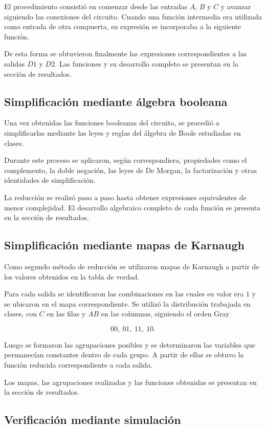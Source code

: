 \documentclass[12pt]{report}
\begin{document}
El procedimiento consistió en comenzar desde las entradas $A$, $B$ y $C$ y avanzar
siguiendo las conexiones del circuito. Cuando una función intermedia era utilizada
como entrada de otra compuerta, su expresión se incorporaba a la siguiente función.

De esta forma se obtuvieron finalmente las expresiones correspondientes a las
salidas $D1$ y $D2$. Las funciones y su desarrollo completo se presentan en la
sección de resultados.


\subsection{Simplificación mediante álgebra booleana}

Una vez obtenidas las funciones booleanas del circuito, se procedió a simplificarlas
mediante las leyes y reglas del álgebra de Boole estudiadas en clases.

Durante este proceso se aplicaron, según correspondiera, propiedades como el
complemento, la doble negación, las leyes de De Morgan, la factorización y otras
identidades de simplificación.

La reducción se realizó paso a paso hasta obtener expresiones equivalentes de menor
complejidad. El desarrollo algebraico completo de cada función se presenta en la
sección de resultados.


\subsection{Simplificación mediante mapas de Karnaugh}

Como segundo método de reducción se utilizaron mapas de Karnaugh a partir de los
valores obtenidos en la tabla de verdad.

Para cada salida se identificaron las combinaciones en las cuales su valor era $1$
y se ubicaron en el mapa correspondiente. Se utilizó la distribución trabajada en
clases, con $C$ en las filas y $AB$ en las columnas, siguiendo el orden Gray

\[
00,\ 01,\ 11,\ 10.
\]

Luego se formaron las agrupaciones posibles y se determinaron las variables que
permanecían constantes dentro de cada grupo. A partir de ellas se obtuvo la función
reducida correspondiente a cada salida.

Los mapas, las agrupaciones realizadas y las funciones obtenidas se presentan en la
sección de resultados.


\subsection{Verificación mediante simulación}
\end{document}
